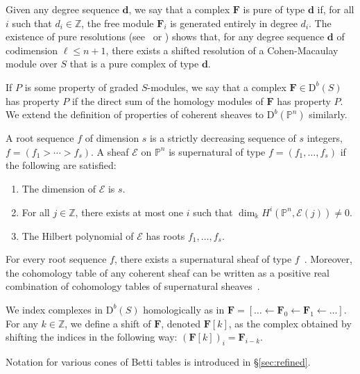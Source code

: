 \documentclass[12pt]{amsart}
\theoremstyle{definition}
\theoremstyle{remark}
\newcommand{\PP}{\mathbb{P}}
\newcommand{\ZZ}{\mathbb{Z}}
\newcommand{\dd}{\mathbf{d}}
\newcommand{\cE}{\mathcal{E}}
\newcommand{\FF}{\mathbf{F}}
\newcommand{\defi}[1]{\textsf{#1}} %
\newcommand{\DD}{\mathrm{D}}
\begin{document}
Given any degree sequence $\dd$, we say that a complex $\FF$ is \defi{pure of type $\dd$} if, for all $i$ such that $d_i\in \ZZ$, the free module $\FF_i$ is generated entirely in degree $d_i$.   The existence of pure resolutions (see~\cite{efw} or \cite[\S5]{eis-schrey1}) shows that, for any  degree sequence $\dd$ of codimension $\ell\leq n+1$, there exists a shifted resolution of a Cohen-Macaulay module over $S$ that is a pure complex of type $\dd$.  

If $P$ is some property of graded $S$-modules, we say that a complex $\FF \in \DD^b(S)$ has property $P$ if the direct sum of the homology modules of $\FF$ has property $P$. We extend the definition of  properties of coherent sheaves to $\DD^b(\PP^n)$ similarly.  

A \defi{root sequence $f$ of dimension $s$} is a strictly decreasing sequence
of $s$ integers, $f=(f_1>\cdots>f_s)$.  
A sheaf $\cE$ on $\PP^{n}$ is
\defi{supernatural of type} $f=(f_1, \dots, f_{s})$ if the following are satisfied: 
\begin{enumerate}
\item The dimension of $\cE$ is $s$.
\item For all $j\in \mathbb Z$, there exists at most one $i$ 
		such that $\dim_\Bbbk H^i(\PP^{n}, \cE(j))\ne 0$.
\item The Hilbert polynomial of $\cE$ has roots $f_1, \dots, f_{s}$.
\end{enumerate}
For every root sequence $f$, there exists a supernatural sheaf of type
$f$~\cite[Theorem~0.4]{eis-schrey1}.
Moreover, the cohomology table of any coherent sheaf 
can be written as a positive real combination of cohomology tables 
of supernatural sheaves~\cite[Theorem~0.1]{eis-schrey1}.  


We index complexes in $\DD^b(S)$ homologically as in $\FF=[\dots \gets \FF_0\gets \FF_1\gets \dots]$.  For any $k\in \ZZ$, we define a \defi{shift} of $\FF$, denoted $\FF[k]$, as the complex obtained by shifting the indices in the following way:  $(\FF[k])_i=\FF_{i-k}$.

Notation for various cones of Betti tables is introduced in \S\ref{sec:refined}.

\end{document}
